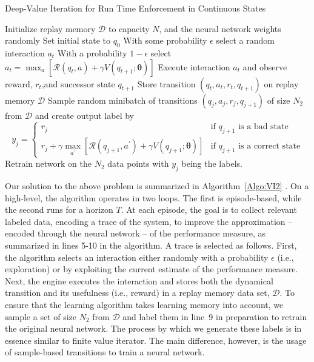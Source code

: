 \begin{algorithm}[h!]
\caption{Deep-Value Iteration for Run Time Enforcement in Continuous States}
\label{Algo:VI2}
\begin{algorithmic}[1]
\STATE Initialize replay memory $\mathcal{D}$ to capacity $N$, and the neural network weights randomly 
\STATE Set initial state to $q_{0}$
\STATE With some probability $\epsilon$ select a random interaction $a_{t}$
\STATE With a probability $1 - \epsilon$ select $a_{t} = \max_{a} \left[\mathcal{R}(q_{t}, a) + \gamma V(q_{t+1};\bm{\theta})\right]$
\STATE Execute interaction $a_{t}$ and observe reward, $r_{t}$,and successor state $q_{t+1}$
\STATE Store transition $\left(q_{t}, a_{t}, r_{t}, q_{t+1}\right)$ on replay memory $\mathcal{D}$
\STATE Sample random minibatch of transitions $\left(q_{j}, a_{j}, r_{j}, q_{j+1}\right)$ of size $N_{2}$ from $\mathcal{D}$ and create output label by 
\begin{displaymath}
   y_{j} = \left\{
     \begin{array}{lr}
       r_{j} & \text{if $q_{j+1}$ is a bad state}\\
        r_{j} + \gamma \max_{a^{\prime}}\left[\mathcal{R}(q_{j+1}, a^{\prime}) + \gamma V(q_{j+1};\bm{\theta})\right]  & \text{if $q_{j+1}$ is a correct state}
     \end{array}
   \right.
\end{displaymath} 
\ENDFOR
\STATE Retrain network on the $N_{2}$ data points with $y_{j}$ being the labels. 
\ENDFOR
\end{algorithmic}
\end{algorithm}
Our solution to the above problem is summarized in Algorithm~\ref{Algo:VI2} . On a high-level, the algorithm operates in two loops. The first is episode-based, while the second runs for a horizon $T$. 
At each episode, the goal is to collect relevant labeled data, encoding a trace of the system, to improve the approximation -- encoded through the neural network -- of the performance measure, as summarized in lines 5-10 in the algorithm. A trace is selected as follows. First, the algorithm selects an interaction either randomly with a probability $\epsilon$ (i.e., exploration) or by exploiting the current estimate of the performance measure. Next, the engine executes the interaction and stores both the dynamical transition and its usefulness (i.e., reward) in a replay memory data set, $\mathcal{D}$. To ensure that the learning algorithm takes learning memory into account, we sample a set of size $N_{2}$ from $\mathcal{D}$ and label them in line~9  in preparation to retrain the original neural network. The process by which we generate these labels is in essence similar to finite value iterator. The main difference, however, is the usage of sample-based transitions to train a neural network.  


